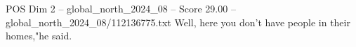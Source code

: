 \begin{textsample}{POS Dim 2 – global\_north\_2024\_08 – Score 29.00 – global\_north\_2024\_08/112136775.txt}
Well, here you don't have people in their homes,"he said.

\end{textsample}
